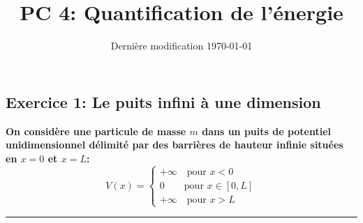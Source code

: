 \documentclass[french]{article}
\begin{document}
	
	\title{PC 4: Quantification de l'énergie}
	\date{Dernière modification \today}
	
	\maketitle
	
	\subsection*{Exercice 1: Le puits infini à une dimension}
	\textbf{On considère une particule de masse $m$ dans un puits de potentiel unidimensionnel délimité par des barrières de hauteur infinie situées en $x=0$ et $x=L$:
		\begin{equation}
			V(x) = \begin{cases}
			+\infty \quad \text{pour $x<0$} \\
			0 \quad \quad \text{pour $x \in [0, L]$}\\
			+\infty \quad \text{pour $x > L$}
			\end{cases}
		\end{equation}
	}
	\vspace{.3cm}
	\hrule
	\vspace{.3cm}
\end{document}
